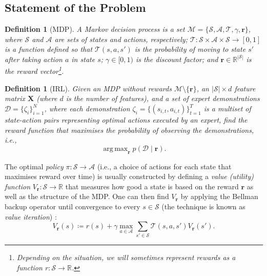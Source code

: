 \documentclass{mpaper}
\newtheorem{definition}[theorem]{Definition}
\DeclareMathOperator*{\argmax}{arg\,max}
\newcommand{\V}{V_{\mathbf{r}}}
\begin{document}
\subsection{Statement of the Problem}

\begin{definition}[MDP]
  A \emph{Markov decision process} is a set $\mathcal{M} = \{ \mathcal{S},
  \mathcal{A}, \mathcal{T}, \gamma, \mathbf{r} \}$, where $\mathcal{S}$ and
  $\mathcal{A}$ are sets of states and actions, respectively; $\mathcal{T} :
  \mathcal{S} \times \mathcal{A} \times \mathcal{S} \to [0, 1]$ is a function
  defined so that $\mathcal{T}(s, a, s')$ is the probability of moving to state $s'$
  after taking action $a$ in state $s$; $\gamma \in [0, 1)$ is the discount
  factor; and $\mathbf{r} \in \mathbb{R}^{|\mathcal{S}|}$ is the reward
  vector\footnote{Depending on the situation, we will sometimes represent
    rewards as a function $r : \mathcal{S} \to \mathbb{R}$.}.
\end{definition}

\begin{definition}[IRL]
  Given an MDP without rewards $\mathcal{M} \setminus \{ \mathbf{r} \}$, an
  $|\mathcal{S}| \times d$ feature matrix $\mathbf{X}$ (where $d$ is the number
  of features), and a set of expert demonstrations $\mathcal{D} = \{\zeta_i
  \}_{i=1}^N$, where each demonstration $\zeta_i = \{ (s_{i,t}, a_{i,t})
  \}_{t=1}^T$ is a multiset of state-action pairs representing optimal actions
  executed by an expert, find the reward function that maximises the probability
  of observing the demonstrations, i.e.,
  \[
    \argmax_{\mathbf{r}} p(\mathcal{D} \mid \mathbf{r}).
  \]
\end{definition}

The optimal \emph{policy} $\pi : \mathcal{S} \to \mathcal{A}$ (i.e., a choice of
actions for each state that maximises reward over time) is usually constructed
by defining a \emph{value (utility) function} $\V : \mathcal{S} \to \mathbb{R}$
that measures how good a state is based on the reward $\mathbf{r}$ as well as
the structure of the MDP. One can then find $\V$ by applying the Bellman backup
operator until convergence to every $s \in \mathcal{S}$ (the technique is known
as \emph{value iteration}) \cite{DBLP:books/daglib/0023820}:
\[
  V_{\mathbf{r}}(s) \coloneqq r(s) + \gamma \max_{a \in \mathcal{A}} \sum_{s' \in
    \mathcal{S}} \mathcal{T}(s, a, s')V_{\mathbf{r}}(s').
\]
\end{document}
